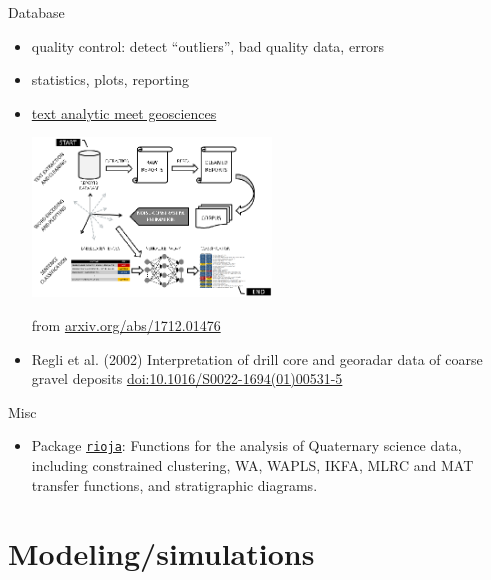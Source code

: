 \documentclass[8pt,ignorenonframetext,]{beamer}
\providecommand{\tightlist}{%
  \setlength{\itemsep}{0pt}\setlength{\parskip}{0pt}}
\begin{document}
\begin{frame}{Database}

\begin{itemize}
\item
  quality control: detect ``outliers'', bad quality data, errors
\item
  statistics, plots, reporting
\item
  \href{https://paulhcleverley.com/2017/05/28/text-analytics-meets-geoscience/}{text
  analytic meet geosciences}

  \includegraphics[width=0.50000\textwidth]{imgPres/text_analyse_drilling_report.png}

  from \href{https://arxiv.org/abs/1712.01476}{arxiv.org/abs/1712.01476}
\item
  Regli et al. (2002) Interpretation of drill core and georadar data of
  coarse gravel deposits
  \href{https://doi.org/10.1016/S0022-1694(01)00531-5}{doi:10.1016/S0022-1694(01)00531-5}
\end{itemize}

\end{frame}

\begin{frame}[fragile]{Misc}

\begin{itemize}
\tightlist
\item
  Package
  \href{https://cran.r-project.org/web/packages/rioja/}{\texttt{rioja}}:
  Functions for the analysis of Quaternary science data, including
  constrained clustering, WA, WAPLS, IKFA, MLRC and MAT transfer
  functions, and stratigraphic diagrams.
\end{itemize}

\end{frame}

\section{Modeling/simulations}\label{modelingsimulations}
\end{document}
